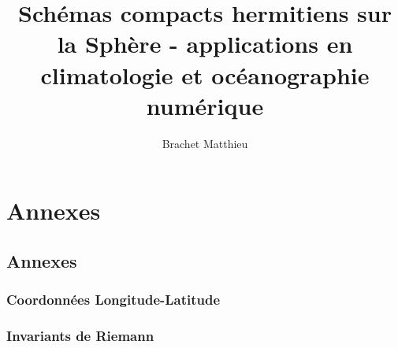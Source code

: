 \documentclass[10pt,a4paper]{book}
\author{Brachet Matthieu}
\title{Schémas compacts hermitiens sur la Sphère - applications en climatologie et océanographie numérique}
\begin{document}
\maketitle
\tableofcontents
\listoffigures
\listoftables

%
%




 



%
\part{Annexes}
\chapter{Annexes} 
\section{Coordonnées Longitude-Latitude}

\section{Invariants de Riemann}




\end{document}
